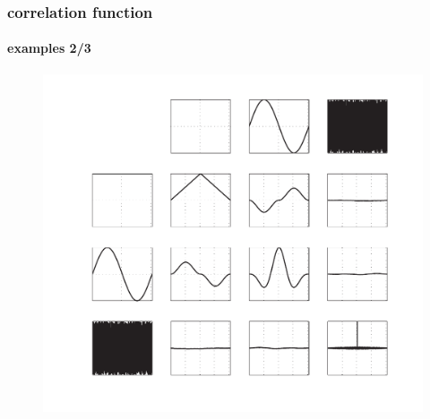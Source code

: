 \begin{frame}\frametitle{correlation function}\framesubtitle{examples 2/3}
    \vspace{-5mm}
    \begin{figure}
        \centering
            \includegraphics[scale=.5]{graph/xcorr}
        \label{fig:xcorr}
    \end{figure}
\end{frame}

